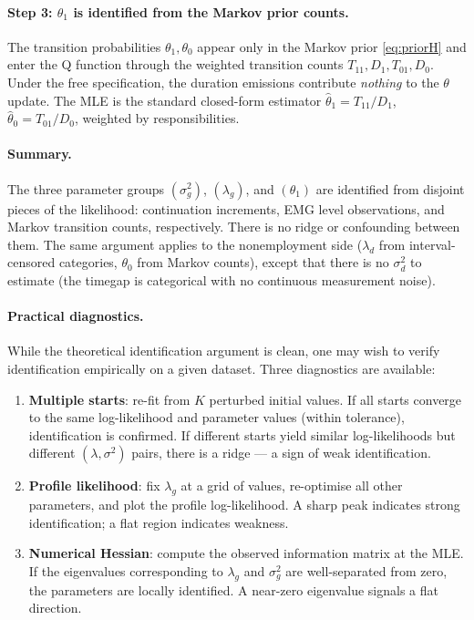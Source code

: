 \documentclass[12pt]{article}
\begin{document}
\paragraph{Step 3: \(\theta_1\) is identified from the Markov prior counts.}
The transition probabilities \(\theta_1, \theta_0\) appear only in the Markov prior \eqref{eq:priorH} and enter the Q function through the weighted transition counts \(T_{11}, D_1, T_{01}, D_0\). Under the free specification, the duration emissions contribute \emph{nothing} to the \(\theta\) update. The MLE is the standard closed-form estimator \(\hat{\theta}_1 = T_{11}/D_1\), \(\hat{\theta}_0 = T_{01}/D_0\), weighted by responsibilities.

\paragraph{Summary.} The three parameter groups \((\sigma_g^2)\), \((\lambda_g)\), and \((\theta_1)\) are identified from disjoint pieces of the likelihood: continuation increments, EMG level observations, and Markov transition counts, respectively. There is no ridge or confounding between them. The same argument applies to the nonemployment side (\(\lambda_d\) from interval-censored categories, \(\theta_0\) from Markov counts), except that there is no \(\sigma_d^2\) to estimate (the timegap is categorical with no continuous measurement noise).

\paragraph{Practical diagnostics.}
While the theoretical identification argument is clean, one may wish to verify identification empirically on a given dataset. Three diagnostics are available:
\begin{enumerate}
\item \textbf{Multiple starts}: re-fit from \(K\) perturbed initial values. If all starts converge to the same log-likelihood and parameter values (within tolerance), identification is confirmed. If different starts yield similar log-likelihoods but different \((\lambda, \sigma^2)\) pairs, there is a ridge --- a sign of weak identification.
\item \textbf{Profile likelihood}: fix \(\lambda_g\) at a grid of values, re-optimise all other parameters, and plot the profile log-likelihood. A sharp peak indicates strong identification; a flat region indicates weakness.
\item \textbf{Numerical Hessian}: compute the observed information matrix at the MLE. If the eigenvalues corresponding to \(\lambda_g\) and \(\sigma_g^2\) are well-separated from zero, the parameters are locally identified. A near-zero eigenvalue signals a flat direction.
\end{enumerate}
\end{document}
